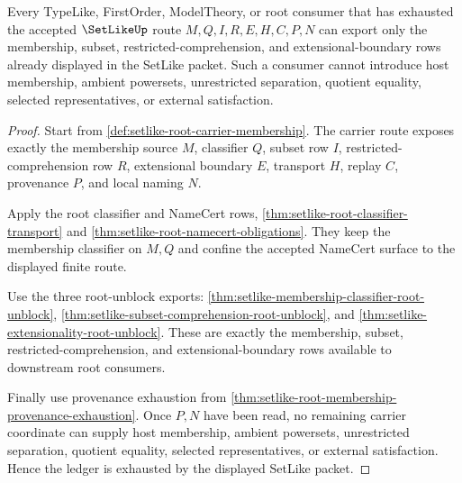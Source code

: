 \begin{theorem}\label{thm:setlike-root-membership-nonescape-ledger}
Every TypeLike, FirstOrder, ModelTheory, or root consumer that has exhausted the accepted $\SetLikeUp$ route $M,Q,I,R,E,H,C,P,N$ can export only the membership, subset, restricted-comprehension, and extensional-boundary rows already displayed in the SetLike packet. Such a consumer cannot introduce host membership, ambient powersets, unrestricted separation, quotient equality, selected representatives, or external satisfaction.
\end{theorem}
\begin{proof}
Start from \autoref{def:setlike-root-carrier-membership}. The carrier route exposes exactly the membership source $M$, classifier $Q$, subset row $I$, restricted-comprehension row $R$, extensional boundary $E$, transport $H$, replay $C$, provenance $P$, and local naming $N$.

Apply the root classifier and NameCert rows, \autoref{thm:setlike-root-classifier-transport} and \autoref{thm:setlike-root-namecert-obligations}. They keep the membership classifier on $M,Q$ and confine the accepted NameCert surface to the displayed finite route.

Use the three root-unblock exports: \autoref{thm:setlike-membership-classifier-root-unblock}, \autoref{thm:setlike-subset-comprehension-root-unblock}, and \autoref{thm:setlike-extensionality-root-unblock}. These are exactly the membership, subset, restricted-comprehension, and extensional-boundary rows available to downstream root consumers.

Finally use provenance exhaustion from \autoref{thm:setlike-root-membership-provenance-exhaustion}. Once $P,N$ have been read, no remaining carrier coordinate can supply host membership, ambient powersets, unrestricted separation, quotient equality, selected representatives, or external satisfaction. Hence the ledger is exhausted by the displayed SetLike packet.
\end{proof}
